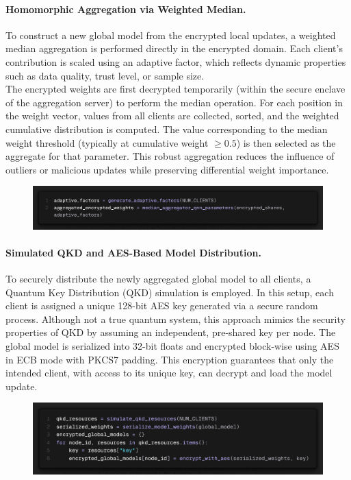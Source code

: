 \documentclass[10pt]{article}
\begin{document}
\paragraph{Homomorphic Aggregation via Weighted Median.}
To construct a new global model from the encrypted local updates, a weighted median aggregation is performed directly in the encrypted domain. Each client's contribution is scaled using an adaptive factor, which reflects dynamic properties such as data quality, trust level, or sample size.\\
The encrypted weights are first decrypted temporarily (within the secure enclave of the aggregation server) to perform the median operation. For each position in the weight vector, values from all clients are collected, sorted, and the weighted cumulative distribution is computed. The value corresponding to the median weight threshold (typically at cumulative weight $\geq 0.5$) is then selected as the aggregate for that parameter. This robust aggregation reduces the influence of outliers or malicious updates while preserving differential weight importance.
\begin{figure}[H]
	\centering
	\includegraphics[height = 0.08\textheight]{img/QFL_code/9.png}
\end{figure}

\paragraph{Simulated QKD and AES-Based Model Distribution.}
To securely distribute the newly aggregated global model to all clients, a Quantum Key Distribution (QKD) simulation is employed. In this setup, each client is assigned a unique 128-bit AES key generated via a secure random process. Although not a true quantum system, this approach mimics the security properties of QKD by assuming an independent, pre-shared key per node.
The global model is serialized into 32-bit floats and encrypted block-wise using AES in ECB mode with PKCS7 padding. This encryption guarantees that only the intended client, with access to its unique key, can decrypt and load the model update.
\begin{figure}[H]
	\centering
	\includegraphics[height = 0.15\textheight]{img/QFL_code/10.png}
\end{figure}
\end{document}
